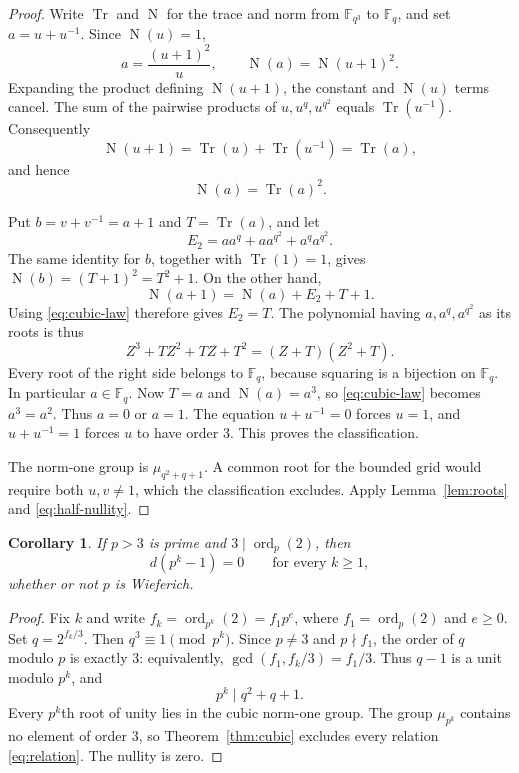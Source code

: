 \documentclass[a4paper]{article}
\newtheorem{corollary}[theorem]{Corollary}
\newcommand{\F}{\mathbb F}
\newcommand{\ord}{\operatorname{ord}}
\DeclareMathOperator{\Tr}{Tr}
\DeclareMathOperator{\Nm}{N}
\begin{document}
\begin{proof}
Write $\Tr$ and $\Nm$ for the trace and norm from $\F_{q^3}$ to
$\F_q$, and set $a=u+u^{-1}$.  Since $\Nm(u)=1$,
\[
 a=\frac{(u+1)^2}{u},\qquad
 \Nm(a)=\Nm(u+1)^2.
\]
Expanding the product defining $\Nm(u+1)$, the constant and
$\Nm(u)$ terms cancel.  The sum of the pairwise products of
$u,u^q,u^{q^2}$ equals $\Tr(u^{-1})$.  Consequently
\[
 \Nm(u+1)=\Tr(u)+\Tr(u^{-1})=\Tr(a),
\]
and hence
\begin{equation}\label{eq:cubic-law}
 \boxed{\ \Nm(a)=\Tr(a)^2.\ }
\end{equation}

Put $b=v+v^{-1}=a+1$ and $T=\Tr(a)$, and let
\[
 E_2=aa^q+aa^{q^2}+a^qa^{q^2}.
\]
The same identity for $b$, together with $\Tr(1)=1$, gives
$\Nm(b)=(T+1)^2=T^2+1$.  On the other hand,
\[
 \Nm(a+1)=\Nm(a)+E_2+T+1.
\]
Using \eqref{eq:cubic-law} therefore gives $E_2=T$.
The polynomial having $a,a^q,a^{q^2}$ as its roots is thus
\[
 Z^3+TZ^2+TZ+T^2=(Z+T)(Z^2+T).
\]
Every root of the right side belongs to $\F_q$, because squaring is a
bijection on $\F_q$.  In particular $a\in\F_q$.
Now $T=a$ and $\Nm(a)=a^3$, so \eqref{eq:cubic-law} becomes
$a^3=a^2$.  Thus $a=0$ or $a=1$.
The equation $u+u^{-1}=0$ forces $u=1$, and
$u+u^{-1}=1$ forces $u$ to have order $3$.
This proves the classification.

The norm-one group is $\mu_{q^2+q+1}$.  A common root for the bounded
grid would require both $u,v\ne1$, which the classification excludes.
Apply Lemma~\ref{lem:roots} and \eqref{eq:half-nullity}.
\end{proof}

\begin{corollary}\label{cor:cubic-primes}
If $p>3$ is prime and $3\mid\ord_p(2)$, then
\[
 d(p^k-1)=0\qquad\text{for every }k\geq1,
\]
whether or not $p$ is Wieferich.
\end{corollary}

\begin{proof}
Fix $k$ and write $f_k=\ord_{p^k}(2)=f_1p^e$, where
$f_1=\ord_p(2)$ and $e\geq0$.
Set $q=2^{f_k/3}$.
Then $q^3\equiv1\pmod{p^k}$.
Since $p\ne3$ and $p\nmid f_1$, the order of $q$ modulo $p$ is
exactly $3$: equivalently,
$\gcd(f_1,f_k/3)=f_1/3$.
Thus $q-1$ is a unit modulo $p^k$, and
\[
 p^k\mid q^2+q+1.
\]
Every $p^k$th root of unity lies in the cubic norm-one group.
The group $\mu_{p^k}$ contains no element of order $3$, so
Theorem~\ref{thm:cubic} excludes every relation
\eqref{eq:relation}.  The nullity is zero.
\end{proof}
\end{document}
